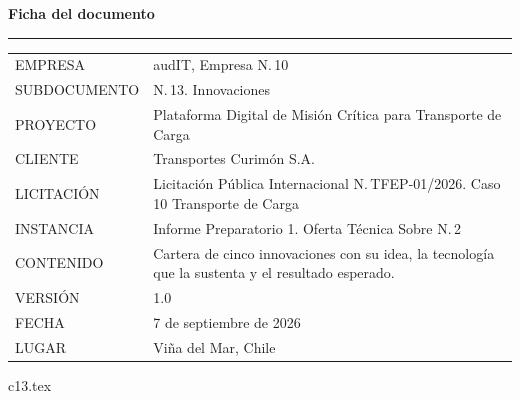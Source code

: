 \documentclass[12pt, letterpaper, table, xcdraw]{inf-pucv}
\begin{document}

\thispagestyle{empty}
\vspace*{1.2cm}
{\color{audITnavy}\fontsize{28}{32}\selectfont\bfseries Ficha del documento}

\vspace{10pt}
{\color{audITteal}\rule{\linewidth}{2pt}}

\vspace{22pt}
{\small
\begin{longtable}{@{}p{3.5cm}p{10.5cm}@{}}
\color{audITgris}EMPRESA & \color{black}audIT, Empresa N.\textordmasculine{}\,10 \\
\color{audITgris}SUBDOCUMENTO & \color{black}N.\textordmasculine{}\,13. Innovaciones \\
\color{audITgris}PROYECTO & \color{black}Plataforma Digital de Misión Crítica para Transporte de Carga \\
\color{audITgris}CLIENTE & \color{black}Transportes Curimón S.A. \\
\color{audITgris}LICITACIÓN & \color{black}Licitación Pública Internacional N.\textordmasculine{}\,TFEP-01/2026. Caso 10 Transporte de Carga \\
\color{audITgris}INSTANCIA & \color{black}Informe Preparatorio 1. Oferta Técnica Sobre N.\textordmasculine{}\,2 \\
\color{audITgris}CONTENIDO & \color{black}Cartera de cinco innovaciones con su idea, la tecnología que la sustenta y el resultado esperado. \\
\color{audITgris}VERSIÓN & \color{black}1.0 \\
\color{audITgris}FECHA & \color{black}7 de septiembre de 2026 \\
\color{audITgris}LUGAR & \color{black}Viña del Mar, Chile \\
\end{longtable}}
\clearpage

\setcounter{page}{1}
\renewcommand{\contentsname}{Índice}
\tableofcontents
\clearpage

{c13.tex}

\clearpage
{}
{}
\printbibliography[title={Bibliografía}]
\end{document}
